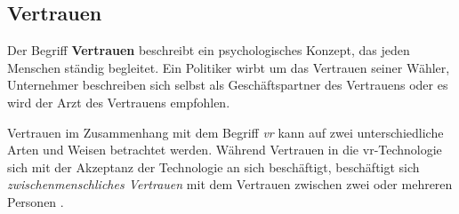\documentclass[a4paper,11pt]{article}%
\renewcommand{\\}{\vspace*{0.5\baselineskip} \newline}
\begin{document}
{%

%	

\newpage

\subsection{Vertrauen}
\label{Vertrauen}
Der Begriff \textbf{Vertrauen} beschreibt ein psychologisches Konzept, das jeden Menschen ständig begleitet.
Ein Politiker wirbt um das Vertrauen seiner Wähler, Unternehmer beschreiben sich selbst als \glqq{}Geschäftspartner des Vertrauens\grqq{} oder es wird der \glqq{}Arzt des Vertrauens\dq{} empfohlen.

Vertrauen im Zusammenhang mit dem Begriff \textit{\ac{vr}} kann auf zwei unterschiedliche Arten und Weisen betrachtet werden. 
Während Vertrauen in die \ac{vr}-Technologie sich mit der Akzeptanz der Technologie an sich beschäftigt, beschäftigt sich \textit{zwischenmenschliches Vertrauen} mit dem Vertrauen zwischen zwei oder mehreren Personen \citep{mcknight2011trust}.

}
\end{document}
